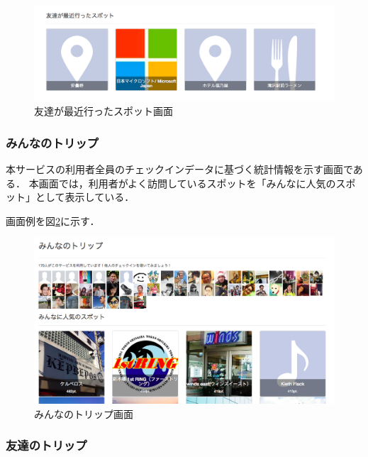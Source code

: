 \documentclass{jsarticle}
\begin{document}
\begin{figure}[!ht]
\begin{center}
\includegraphics[width=12.0cm]{./image/cheekitrip_friends_recently_spot.png}
\caption{友達が最近行ったスポット画面}
\label{cheekitrip_friends_recently_spot}
\end{center}
\end{figure}

\subsubsection{みんなのトリップ}

本サービスの利用者全員のチェックインデータに基づく統計情報を示す画面である．
本画面では，利用者がよく訪問しているスポットを「みんなに人気のスポット」として表示している．

画面例を図\ref{cheekitrip_everyone}に示す．


\begin{figure}[!ht]
\begin{center}
\includegraphics[width=12.0cm]{./image/cheekitrip_everyone.png}
\caption{みんなのトリップ画面}
\label{cheekitrip_everyone}
\end{center}
\end{figure}

\subsubsection{友達のトリップ}
\end{document}
